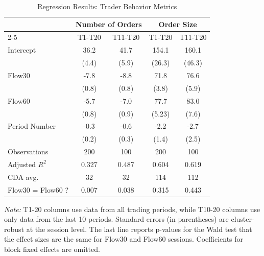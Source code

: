 \documentclass[12pt]{article}
\begin{document}
\begin{table}[ht]
\centering    
\caption{Regression Results: Trader Behavior Metrics}
\begin{threeparttable}
\begin{tabular}{@{\extracolsep{5pt}}lcccc}
\toprule
& \multicolumn{2}{c}{Number of Orders} & \multicolumn{2}{c}{Order Size} \\
\cmidrule{2-5}
& T1-T20 & T11-T20 & T1-T20 & T11-T20 \\
\midrule
Intercept & 36.2$ $ & 41.7$ $ & 154.1$ $ & 160.1$ $ \\
  & (4.4) & (5.9) & (26.3) & (46.3) \\
Flow30 & -7.8$ $ & -8.8$ $ & 71.8$ $ & 76.6$ $ \\
  & (0.8) & (0.8) & (3.8) & (5.9) \\
Flow60 & -5.7$ $ & -7.0$ $ & 77.7$ $ & 83.0$ $ \\
  & (0.8) & (0.9) & (5.23) & (7.6) \\
Period Number  & -0.3$^{}$ & -0.6$ $ & -2.2$^{}$ & -2.7$^{}$ \\
  & (0.2) & (0.3) & (1.4) & (2.5) \\
\midrule
Observations & 200 & 100 & 200 & 100 \\
Adjusted $R^2$ & 0.327 & 0.487 & 0.604 & 0.619 \\
\midrule
CDA avg. & 32 & 32 & 114 & 112 \\
Flow30 = Flow60 ? & 0.007 & 0.038 & 0.315 & 0.443 \\ %
\bottomrule
\end{tabular}
\begin{tablenotes}
\footnotesize
\textit{Note:} %
T1-20 columns use data from all trading periods, while T10-20 columns use only data from the last 10 periods.
Standard errors (in parentheses) are cluster-robust at the session level. 
The last line reports p-values for the Wald test that the effect sizes are the same for Flow30 and Flow60 sessions.
Coefficients for block fixed effects are omitted.  
\end{tablenotes}
\end{threeparttable}
\label{tab:TradersBehavior}
\end{table}
\end{document}

